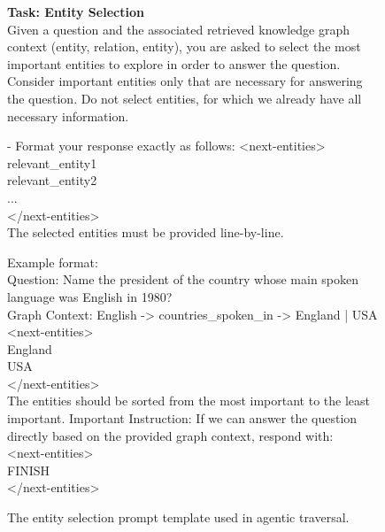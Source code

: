 
\begin{figure}
\begin{minipage}{1\columnwidth}
    \centering
\begin{tcolorbox}[title=Entity Selection Prompt]
        \small
        \vspace{10pt}
        \textbf{Task: Entity Selection} \\
        Given a question and the associated retrieved knowledge graph context (entity, relation, entity), you are asked to select the most important entities to explore in order to answer the question.
  Consider important entities only that are necessary for answering the question. Do not select entities, for which we already have all necessary information.

  - Format your response exactly as follows:
    <next-entities> \\
    relevant\_entity1 \\
    relevant\_entity2 \\
      ... \\
    </next-entities> \\
  
   The selected entities must be provided line-by-line.

  Example format:\\
    Question: Name the president of the country whose main spoken language was English in 1980? \\
    Graph Context: English -> countries\_spoken\_in -> England | USA \\

    <next-entities>\\
    England\\
    USA\\
    </next-entities>\\


  The entities should be sorted from the most important to the least important. 
  Important Instruction: If we can answer the question directly based on the provided graph context, respond with:\\
  <next-entities>\\
  FINISH\\
  </next-entities>\\

    \end{tcolorbox}

\caption{The entity selection prompt template used in agentic traversal. }
\label{fig:agent-entity-prompt}
\end{minipage}
\end{figure}

